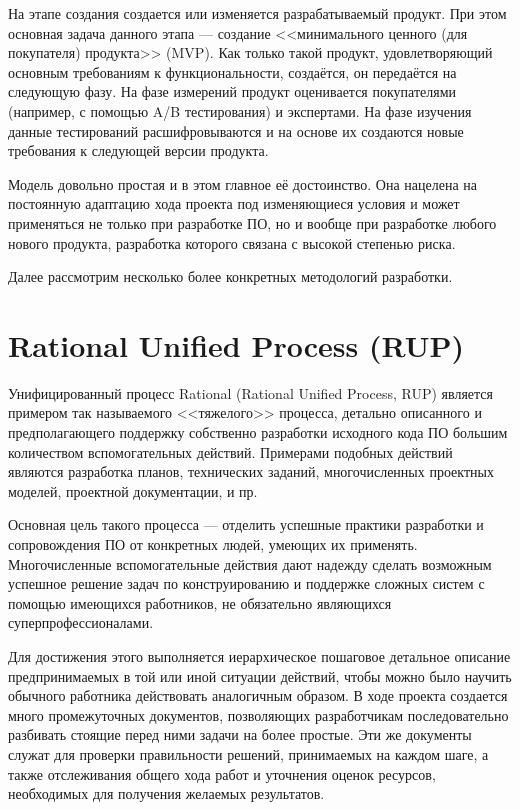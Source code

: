 \documentclass{../../text-style}
\begin{document}
На этапе создания создается или изменяется разрабатываемый продукт. При этом основная задача данного этапа --- создание <<минимального ценного (для покупателя) продукта>> (MVP). Как только такой продукт, удовлетворяющий основным требованиям к функциональности, создаётся, он передаётся на следующую фазу. На фазе измерений продукт оценивается покупателями (например, с помощью A/B тестирования) и экспертами. На фазе изучения данные тестирований расшифровываются и на основе их создаются новые требования к следующей версии продукта.

Модель довольно простая и в этом главное её достоинство. Она нацелена на постоянную адаптацию хода проекта под изменяющиеся условия и может применяться не только при разработке ПО, но и вообще при разработке любого нового продукта, разработка которого связана с высокой степенью риска.

Далее рассмотрим несколько более конкретных методологий разработки. 

\section{Rational Unified Process (RUP)}

Унифицированный процесс Rational (Rational Unified Process, RUP) является примером так называемого <<тяжелого>> процесса, детально описанного и предполагающего поддержку собственно разработки исходного кода ПО большим количеством вспомогательных действий. Примерами подобных действий являются разработка планов, технических заданий, многочисленных проектных моделей, проектной документации, и пр.

Основная цель такого процесса --- отделить успешные практики разработки и сопровождения ПО от конкретных людей, умеющих их применять. Многочисленные вспомогательные действия дают надежду сделать возможным успешное решение задач по конструированию и поддержке сложных систем с помощью имеющихся работников, не обязательно являющихся суперпрофессионалами.

Для достижения этого выполняется иерархическое пошаговое детальное описание предпринимаемых в той или иной ситуации действий, чтобы можно было научить обычного работника действовать аналогичным образом. В ходе проекта создается много промежуточных документов, позволяющих разработчикам последовательно разбивать стоящие перед ними задачи на более простые. Эти же документы служат для проверки правильности решений, принимаемых на каждом шаге, а также отслеживания общего хода работ и уточнения оценок ресурсов, необходимых для получения желаемых результатов.
\end{document}
